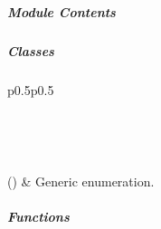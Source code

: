 \documentclass[letterpaper,10pt,english]{sphinxmanual}
\begin{document}
\subparagraph{}
\label{\detokenize{autoapi/pine/backend/log/index:module-pine.backend.log}}\label{\detokenize{autoapi/pine/backend/log/index:pine-backend-log}}\label{\detokenize{autoapi/pine/backend/log/index::doc}}

\subparagraph{Module Contents}
\label{\detokenize{autoapi/pine/backend/log/index:module-contents}}

\subparagraph{Classes}
\label{\detokenize{autoapi/pine/backend/log/index:classes}}

\begin{savenotes}\sphinxatlongtablestart\begin{longtable}[c]{p{0.5\linewidth}p{0.5\linewidth}}
\hline

\endfirsthead

%
{}\\
\hline

\endhead

\hline
{}\\
\endfoot

\endlastfoot

{\hyperref[\detokenize{autoapi/pine/backend/log/index:pine.backend.log.Action}]{}}()
&
Generic enumeration.
\\
\hline
\end{longtable}\sphinxatlongtableend\end{savenotes}


\subparagraph{Functions}
\label{\detokenize{autoapi/pine/backend/log/index:functions}}
\end{document}
